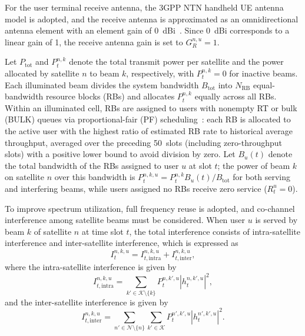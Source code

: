 \documentclass[journal]{IEEEtran}
\newcommand{\revbegin}[1]{\color{revisionblue}\ignorespaces}
\newcommand{\revend}[1]{\color{black}\ignorespaces}
\begin{document}
For the user terminal receive antenna, the 3GPP NTN handheld UE antenna model is adopted, and the receive antenna is approximated as an omnidirectional antenna element with an element gain of 0~dBi~\cite{ref29}. Since 0~dBi corresponds to a linear gain of 1, the receive antenna gain is set to $G_R^{n,u}=1$.

\revbegin{}Let $P_{\mathrm{tot}}$ and $P_t^{n,k}$ denote the total transmit power per satellite and the power allocated by satellite $n$ to beam $k$, respectively, with $P_t^{n,k}=0$ for inactive beams. Each illuminated beam divides the system bandwidth $B_{\mathrm{tot}}$ into $N_{\mathrm{RB}}$ equal-bandwidth resource blocks (RBs) and allocates $P_t^{n,k}$ equally across all RBs. Within an illuminated cell, RBs are assigned to users with nonempty RT or bulk (BULK) queues via proportional-fair (PF) scheduling~\cite{refPFclassic,refPFrb}: each RB is allocated to the active user with the highest ratio of estimated RB rate to historical average throughput, averaged over the preceding 50~slots (including zero-throughput slots) with a positive lower bound to avoid division by zero. Let $B_u(t)$ denote the total bandwidth of the RBs assigned to user $u$ at slot $t$; the power of beam $k$ on satellite $n$ over this bandwidth is $P_t^{n,k,u}=P_t^{n,k}B_u(t)/B_{\mathrm{tot}}$ for both serving and interfering beams, while users assigned no RBs receive zero service ($R_t^u=0$).\revend{}


To improve spectrum utilization, full frequency reuse is adopted, and co-channel interference among satellite beams must be considered. When user $u$ is served by beam $k$ of satellite $n$ at time slot $t$, the total interference consists of intra-satellite interference and inter-satellite interference, which is expressed as
\begin{equation}
I_t^{n,k,u}=I_{t,\mathrm{intra}}^{n,k,u}+I_{t,\mathrm{inter}}^{n,k,u},
\end{equation}
where the intra-satellite interference is given by
\begin{equation}
I_{t,\mathrm{intra}}^{n,k,u}
=
\sum_{k'\in\mathcal{K}\setminus\{k\}}
{P}_t^{n,k',u}
|h_t^{n,k',u}|^2,
\end{equation}
and the inter-satellite interference is given by
\begin{equation}
I_{t,\mathrm{inter}}^{n,k,u}
=
\sum_{n'\in\mathcal{N}\setminus\{n\}}
\sum_{k'\in\mathcal{K}}
{P}_t^{n',k',u}
|h_t^{n',k',u}|^2.
\label{eq:inter-satellite-interference}
\end{equation}
\end{document}
